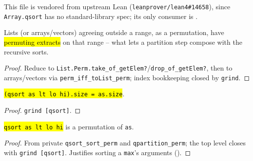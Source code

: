 This file is vendored from upstream Lean (\texttt{leanprover/lean4\#14658}), since
\texttt{Array.qsort} has no standard-library spec; its only consumer is
.

\begin{lemma}
\label{fam:qsort-perm-extract}
\leanok
{}

 Lists (or arrays/vectors) agreeing outside a range, as a permutation, have
\hl{permuting extracts} on that range -- what lets a partition step compose with the recursive sorts.
\end{lemma}
\begin{proof}
\leanok
{} Reduce to \texttt{List.Perm.take\_of\_getElem?}/\texttt{drop\_of\_getElem?}, then to
arrays/vectors via \texttt{perm\_iff\_toList\_perm}; index bookkeeping closed by \texttt{grind}.
\end{proof}

\begin{theorem}
\label{thm:qsort-size}
\leanok
{}

 \hl{\texttt{(qsort as lt lo hi).size = as.size}}.
\end{theorem}
\begin{proof}
\leanok
{} \texttt{grind [qsort]}.
\end{proof}

\begin{theorem}
\label{thm:qsort-perm}
\leanok
{}

 \hl{\texttt{qsort as lt lo hi}} is a permutation of \texttt{as}.
\end{theorem}
\begin{proof}
\leanok
{} From private \texttt{qsort\_sort\_perm} and \texttt{qpartition\_perm}; the top level
closes with \texttt{grind [qsort]}. Justifies sorting a \texttt{max}'s arguments
().
\end{proof}

